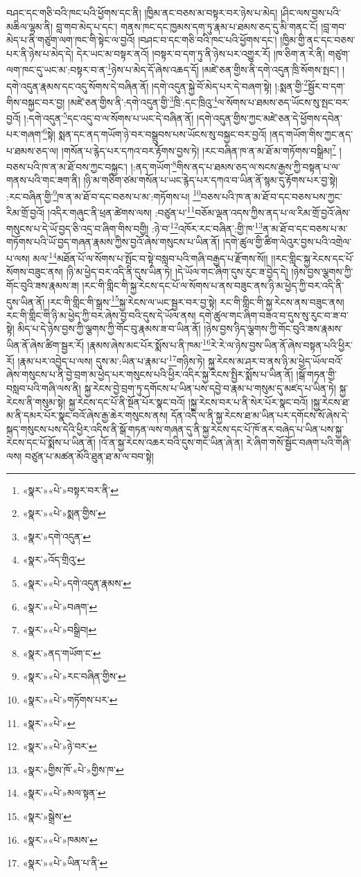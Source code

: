 བཤང་དང་གཅི་བའི་ཁང་པའི་ཕྱོགས་དང་ནི། །ཁྱིམ་ནང་བཅས་མ་བསྟར་བར་ཉེས་པ་མེད། །ཤིང་ལས་བྱས་པའི་མཆིལ་ལྷམ་ནི། བླ་གབ་མེད་པ་དང་། གནས་ཁང་དང་ཁྱམས་དག་ཏུ་རྣམ་པ་ཐམས་ཅད་དུ་མི་གནང་ངོ། །བླ་གབ་མེད་པ་ནི་གཙུག་ལག་ཁང་གི་སྟེང་ལ་བྱའོ། །བཤང་བ་དང་གཅི་བའི་ཁང་པའི་ཕྱོགས་དང་། །ཁྱིམ་གྱི་ནང་དང་བཅས་པར་ནི་ཉེས་པ་མེད་དེ། དེར་ཡང་མ་བསྟར་ནའོ། །བསྟར་བ་དག་ཏུ་ནི་ཉེས་པར་འགྱུར་རོ། །ཁ་ཅིག་ན་རེ་ནི། གཙུག་ལག་ཁང་དུ་ཡང་མ་:བསྟར་བ་ན་\footnote{«སྣར་»«པེ་»བསྟར་བར་ནི་}ཉེས་པ་མེད་དོ་ཞེས་འཆད་དོ། །མཛེ་ཅན་གྱིས་ནི་དགེ་འདུན་ཁྲི་སོགས་སྤང་། །དགེ་འདུན་རྣམས་དང་འདུ་སོགས་དེ་བཞིན་ནོ། །དགེ་འདུན་སྐྱེ་བོ་མེད་པར་དེ་བཞག་སྟེ། །:སྨན་གྱི་\footnote{«སྣར་»«པེ་»སྨན་གྱིས་}སྦྱོར་བ་དག་གིས་བསྐྱང་བར་བྱ། །མཛེ་ཅན་གྱིས་ནི་:དགེ་འདུན་གྱི་\footnote{«སྣར་»དགེ་འདུན་}ཁྲི་:དང་ཁྲིའུ་\footnote{«སྣར་»འོད་གྲིའུ་}ལ་སོགས་པ་ཐམས་ཅད་ཡོངས་སུ་སྤང་བར་བྱའོ། །:དགེ་འདུན་\footnote{«སྣར་»«པེ་»དགེ་འདུན་རྣམས་}དང་འདུ་བ་ལ་སོགས་པ་ཡང་དེ་བཞིན་ནོ། །དགེ་འདུན་གྱིས་ཀྱང་མཛེ་ཅན་དེ་ཕྱོགས་དབེན་པར་གཞག་\footnote{«སྣར་»«པེ་»བཞག་}སྟེ། སྨན་དང་ནད་གཡོག་ཉེ་བར་བསྒྲུབས་པས་ཡོངས་སུ་བསྐྱང་བར་བྱའོ། །ནད་གཡོག་གིས་ཀྱང་ནད་པ་ཐམས་ཅད་ལ། །གསོན་པ་རྙེད་པར་དཀའ་བར་རྟོགས་བྱས་ཏེ། །རང་བཞིན་ཁ་ན་མ་ཐོ་མ་གཏོགས་བསྒྲིམ།\footnote{«སྣར་»«པེ་»བསྒྲིབ།} །བཅས་པའི་ཁ་ན་མ་ཐོ་བས་ཀྱང་བསྐྱང་། །:ནད་གཡོག་\footnote{«སྣར་»ནད་གཡོག་ང་}གིས་ནད་པ་ཐམས་ཅད་ལ་སངས་རྒྱས་ཀྱི་བསྟན་པ་ལ་གནས་པའི་གང་ཟག་ནི། །ཉི་མ་གཅིག་ཙམ་གསོན་པ་ཡང་རྙེད་པར་དཀའ་བ་ཡིན་ནོ་སྙམ་དུ་རྟོགས་པར་བྱ་སྟེ། :རང་བཞིན་གྱི་\footnote{«སྣར་»«པེ་»རང་བཞིན་གྱིས་}ཁ་ན་མ་ཐོ་བ་དང་བཅས་པ་མ་:གཏོགས་པ། \footnote{«སྣར་»«པེ་»གཏོགས་པར་}བཅས་པའི་ཁ་ན་མ་ཐོ་བ་དང་བཅས་པས་ཀྱང་རིམ་གྲོ་བྱའོ། །འདིར་གཞུང་ནི་ཕྲན་ཚེགས་ལས། :བཙུན་པ་\footnote{«སྣར་»«པེ་»}བཅོམ་ལྡན་འདས་ཀྱིས་ནད་པ་ལ་རིམ་གྲོ་བྱའོ་ཞེས་གསུངས་པ་དེ་ཡོ་བྱད་ཅི་འདྲ་བ་ཞིག་གིས་བགྱི། :ཉེ་བ་\footnote{«སྣར་»«པེ་»ཉེ་བར་}འཁོར་རང་བཞིན་:གྱི་ཁ་\footnote{«སྣར་»གྱིས་ཁོ་«པེ་»གྱིས་ཁ་}ན་མ་ཐོ་བ་དང་བཅས་པ་མ་གཏོགས་པའི་ཡོ་བྱད་གཞན་རྣམས་ཀྱིས་བྱའོ་ཞེས་གསུངས་པ་ཡིན་ནོ། །དགེ་ཚུལ་གྱི་ཚིག་ལེའུར་བྱས་པའི་འགྲེལ་པ་ལས། མལ་\footnote{«སྣར་»«པེ་»མལ་སྟན་}མཐོན་པོ་ལ་སོགས་པ་སྤོང་བ་སྟེ་བསླབ་པའི་གཞི་བརྒྱད་པ་རྫོགས་སོ།། །།རང་གླིང་སྐྱ་རེངས་དང་པོ་སོགས་བཟུང་ནས། །ཉི་མ་ཕྱེད་བར་འདི་ནི་དུས་ཡིན་ཏེ། །དེ་ཡོལ་གང་ཞིག་དུས་རུང་ཟ་བྱེད་དེ། །ཉེས་བྱས་ལྕགས་ཀྱི་གོང་བུའི་ཟས་རྣམས་ཟ། །རང་གི་གླིང་གི་སྐྱ་རེངས་དང་པོ་ལ་སོགས་པ་ནས་བཟུང་ནས་ཉི་མ་ཕྱེད་ཀྱི་བར་འདི་ནི་དུས་ཡིན་ནོ། །རང་གི་གླིང་གི་སྒྲས་\footnote{«སྣར་»སྒྲེས་}སྐྱ་རེངས་ལ་ཡང་སྦྱར་བར་བྱ་སྟེ། རང་གི་གླིང་གི་སྐྱ་རེངས་ནས་བཟུང་ནས། རང་གི་གླིང་གི་ཉི་མ་ཕྱེད་ཀྱི་བར་ཞེས་བྱ་བའི་དུས་དེ་ཡོལ་ནས། དགེ་ཚུལ་གང་ཞིག་བཟའ་བ་དུས་སུ་རུང་བ་ཟ་བ་སྟེ། མིད་པ་དེ་ཉེས་བྱས་ཀྱི་ལྕགས་ཀྱི་གོང་བུ་རྣམས་ཟ་བ་ཡིན་ནོ། །ཉེས་བྱས་ཉིད་ལྕགས་ཀྱི་གོང་བུའི་ཟས་རྣམས་ཡིན་ནོ་ཞེས་ཚིག་སྦྱར་རོ། །རྣམས་ཞེས་མང་པོར་སྨོས་པ་ནི་ཁམ་\footnote{«སྣར་»«པེ་»ཁམས་}རེ་རེ་ལ་ཉེས་བྱས་ཡིན་ནོ་ཞེས་བསྟན་པའི་ཕྱིར་རོ། །རྣམ་པར་འབྱེད་པ་ལས། དུས་མ་:ཡིན་པ་རྣམ་པ་\footnote{«སྣར་»«པེ་»ཡིན་པ་ནི་}གཉིས་ཏེ། སྐྱ་རེངས་མ་ཤར་བ་ནས་ཉི་མ་ཕྱེད་ཡོལ་བའོ་ཞེས་གསུངས་པ་ནི་བྱེ་བྲག་མ་ཕྱེད་པར་གསུངས་པའི་ཕྱིར་འདིར་སྐྱ་རེངས་སྤྱིར་སྨོས་པ་ཡིན་ནོ། །སྒོ་གཏན་གྱི་བསླབ་པའི་གཞི་ལས་ནི། སྐྱ་རེངས་བྱེ་བྲག་ཏུ་དགོངས་པ་ཡིན་པས་དབྱེ་བ་རྣམ་པ་གསུམ་དུ་མཛད་པ་ཡིན་ཏེ། སྐྱ་རེངས་ནི་གསུམ་སྟེ། སྐྱ་རེངས་དང་པོ་ནི་སྔོན་པོར་སྣང་བའོ། །སྐྱ་རེངས་བར་པ་ནི་སེར་པོར་སྣང་བའོ། །སྐྱ་རེངས་ཐ་མ་ནི་དམར་པོར་སྣང་བའོ་ཞེས་རྒྱ་ཆེར་གསུངས་ནས། དོན་འདི་ལ་ནི་སྐྱ་རེངས་ཐ་མ་ཡིན་པར་དགོངས་སོ་ཞེས་དེ་སྐད་གསུངས་པས་དེའི་ཕྱིར་འདིས་ནི་སྒོ་གཏན་ལས་གཞན་དུ་ནི་སྐྱ་རེངས་དང་པོ་ཁོ་ནར་བཞེད་པ་ཡིན་པས་སྐྱ་རེངས་དང་པོ་སྨོས་པ་ཡིན་ནོ། །འོ་ན་སྐྱ་རེངས་འཆར་བའི་དུས་གང་ཡིན་ཞེ་ན། རེ་ཞིག་གསོ་སྦྱོང་བཞག་པའི་གཞི་ལས། བཙུན་པ་མཚན་མོའི་ཐུན་ཐ་མ་ལ་བབ་སྟེ། 